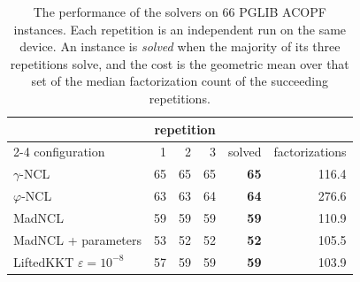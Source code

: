 \begin{table}[hbp]\centering
\caption{The performance of the solvers on $66$ PGLIB ACOPF instances. Each repetition is an independent run on the same device. An instance is \emph{solved} when the majority of its three repetitions solve, and the cost is the geometric mean over that set of the median factorization count of the succeeding repetitions.}
\label{tab:gpu-opf}
\begin{tabular}{lrrrrr}\toprule
 & \multicolumn{3}{c}{repetition} & & \\
\cmidrule(lr){2-4}
configuration & 1 & 2 & 3 & solved & factorizations \\\midrule
$\gamma$-NCL & 65 & 65 & 65 & \textbf{65} & 116.4 \\
$\varphi$-NCL & 63 & 63 & 64 & \textbf{64} & 276.6 \\
MadNCL & 59 & 59 & 59 & \textbf{59} & 110.9 \\
MadNCL + parameters & 53 & 52 & 52 & \textbf{52} & 105.5 \\
LiftedKKT $\varepsilon=10^{-8}$ & 57 & 59 & 59 & \textbf{59} & 103.9 \\
\bottomrule\end{tabular}\end{table}
